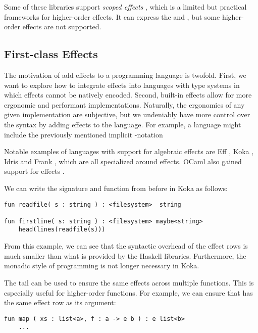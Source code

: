 Some of these libraries support \emph{scoped effects} \autocite{wu_effect_2014}, which is a limited but practical frameworks for higher-order effects. It can express the \olocal and \ocatch, but some higher-order effects are not supported.

\subsection{First-class Effects}

The motivation of add effects to a programming language is twofold. First, we want to explore how to integrate effects into languages with type systems in which effects cannot be natively encoded. Second, built-in effects allow for more ergonomic and performant implementations. Naturally, the ergonomics of any given implementation are subjective, but we undeniably have more control over the syntax by adding effects to the language. For example, a language might include the previously mentioned implicit -notation

Notable examples of languages with support for algebraic effects are Eff \autocite{bauer_programming_2015}, Koka \autocite{leijen_type_2017}, Idris \autocite{brady_programming_2013} and Frank \autocite{lindley_be_2017}, which are all specialized around effects. OCaml also gained support for effects \autocite{sivaramakrishnan_retrofitting_2021}.

We can write the  signature and  function from before in Koka as follows:
\begin{lstlisting}[language={},style=fancy]
fun readfile( s : string ) : <filesystem>  string

fun firstline( s: string ) : <filesystem> maybe<string>
    head(lines(readfile(s)))
\end{lstlisting}
From this example, we can see that the syntactic overhead of the effect rows is much smaller than what is provided by the Haskell libraries. Furthermore, the monadic style of programming is not longer necessary in Koka.

The tail can be used to ensure the same effects across multiple functions. This is especially useful for higher-order functions. For example, we can ensure that  has the same effect row as its argument:
\begin{lstlisting}[language={},style=fancy]
fun map ( xs : list<a>, f : a -> e b ) : e list<b>
    ...
\end{lstlisting}

